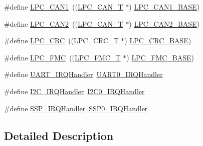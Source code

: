 \begin{DoxyCompactItemize}
\item 
\#define \hyperlink{group__PERIPH__407X__8X__BASE_ga2f006d6888921f8336dce504eb56f4aa}{L\-P\-C\-\_\-\-C\-A\-N1}~((\hyperlink{structLPC__CAN__T}{L\-P\-C\-\_\-\-C\-A\-N\-\_\-\-T}              $\ast$) \hyperlink{group__PERIPH__407X__8X__BASE_gaf2407c1927ebddd767832aefa74c3398}{L\-P\-C\-\_\-\-C\-A\-N1\-\_\-\-B\-A\-S\-E})
\item 
\#define \hyperlink{group__PERIPH__407X__8X__BASE_ga838776140ad5e0156715278f8bb0652d}{L\-P\-C\-\_\-\-C\-A\-N2}~((\hyperlink{structLPC__CAN__T}{L\-P\-C\-\_\-\-C\-A\-N\-\_\-\-T}              $\ast$) \hyperlink{group__PERIPH__407X__8X__BASE_gab9608b3b72dd843a25910dd2a809106b}{L\-P\-C\-\_\-\-C\-A\-N2\-\_\-\-B\-A\-S\-E})
\item 
\#define \hyperlink{group__PERIPH__407X__8X__BASE_gaf01f4835164b4abd2dcc9d89a66ffc21}{L\-P\-C\-\_\-\-C\-R\-C}~((L\-P\-C\-\_\-\-C\-R\-C\-\_\-\-T              $\ast$) \hyperlink{group__PERIPH__407X__8X__BASE_ga6d27804148d49c67065a8cd351ebc7b7}{L\-P\-C\-\_\-\-C\-R\-C\-\_\-\-B\-A\-S\-E})
\item 
\#define \hyperlink{group__PERIPH__407X__8X__BASE_ga406fa416fe50b196b86146ba0b20ba3c}{L\-P\-C\-\_\-\-F\-M\-C}~((\hyperlink{structLPC__FMC__T}{L\-P\-C\-\_\-\-F\-M\-C\-\_\-\-T}              $\ast$) \hyperlink{group__PERIPH__407X__8X__BASE_gaad6b7f57ab13bf5886da624bbb4bcc61}{L\-P\-C\-\_\-\-F\-M\-C\-\_\-\-B\-A\-S\-E})
\item 
\#define \hyperlink{group__PERIPH__407X__8X__BASE_gaf6a20f8c9320377f3713d96ea90bfd10}{U\-A\-R\-T\-\_\-\-I\-R\-Q\-Handler}~\hyperlink{lpc17__uartrb_8c_a1c0544b06d54b198d8c50f507e399a91}{U\-A\-R\-T0\-\_\-\-I\-R\-Q\-Handler}
\item 
\#define \hyperlink{group__PERIPH__407X__8X__BASE_ga78bc9c1986ea5da20688e1db532c5717}{I2\-C\-\_\-\-I\-R\-Q\-Handler}~\hyperlink{lpc17__i2c_8c_a8e817e99d2a59e5f48e4ff0c79e7eef5}{I2\-C0\-\_\-\-I\-R\-Q\-Handler}
\item 
\#define \hyperlink{group__PERIPH__407X__8X__BASE_gac4eb0fc5d2f19b89fa77194876b63df4}{S\-S\-P\-\_\-\-I\-R\-Q\-Handler}~\hyperlink{lpc17__ssp_8c_a56a77444d4b4985ba292102c14c94ed6}{S\-S\-P0\-\_\-\-I\-R\-Q\-Handler}
\end{DoxyCompactItemize}


\subsection{Detailed Description}


